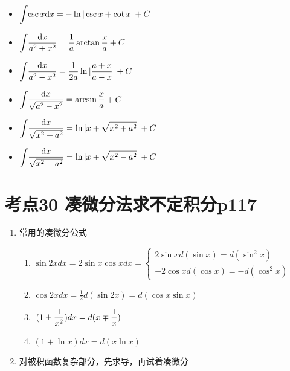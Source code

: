 \begin{multicols}{2}
\begin{itemize}
    \item $ \displaystyle\int_{}\hspace{.2em}\csc x \mathrm{d}x=-\ln|\csc x+\cot x|+C $
    \item $ \displaystyle\int_{}\hspace{.2em}\frac{\mathrm{d}x}{a^{2}+x^{2}}=\frac{1}{a}\arctan \frac{x}{a}+C $
    \item $ \displaystyle\int_{}\hspace{.2em}\frac{\mathrm{d}x}{a^{2}-x^{2}}=\frac{1}{2a}\ln |\frac{a+x}{a-x}|+C $
    \item $ \displaystyle\int_{}\hspace{.2em}\frac{\mathrm{d}x}{\sqrt{a^{2}-x^{2}}}=\arcsin \frac{x}{a}+C $
    \item $ \displaystyle\int_{}\hspace{.2em}\frac{\mathrm{d}x}{\sqrt{x^{2}+a^{2}}}=\ln|x+\sqrt{x^{2}+a^{2}}|+C $
    \item $ \displaystyle\int_{}\hspace{.2em}\frac{\mathrm{d}x}{\sqrt{x^{2}-a^{2}}}=\ln|x+\sqrt{x^{2}-a^{2}}|+C $
    \end{itemize}
\end{multicols}


\section{考点30 凑微分法求不定积分p117}

\begin{enumerate}
    \item 常用的凑微分公式
        \begin{enumerate}
        \item $\sin 2xdx=2\sin x\cos xdx=\left\{
            \begin{array}{cl}
                2\sin xd(\sin x)=d(\sin^2 x)\\
                -2\cos x d(\cos x)=-d(\cos^2 x)
            \end{array}\right.$
        \item $\cos 2xdx=\frac{1}{2}d(\sin 2x)=d(\cos x\sin x)$
        \item $\displaystyle\hspace{.2em}(1\pm \frac{1}{x^2})dx=d(x\mp \frac{1}{x})$
        \item $(1+\ln x)dx=d(x\ln x)$
    \end{enumerate}
    \item 对被积函数复杂部分，先求导，再试着凑微分
\end{enumerate}

